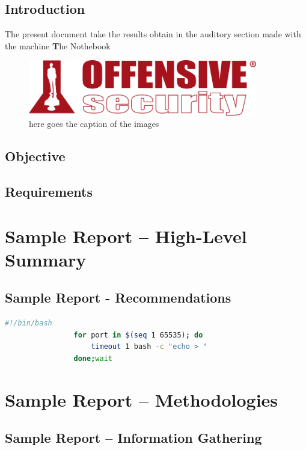 \documentclass[a4paper]{article}
\newcommand{\machinename}{The Nothebook} %
\begin{document}
        \subsection{Introduction}
            The present document take the results obtain in the auditory section made with the 
            machine {\textbf\machinename}
            \vspace{0.2cm}
            \begin{figure}[h]
                \centering
                \includegraphics[width=10cm]{imagenes/offensive-security-logo.png}
                \caption{here goes the caption of the images}
            \end{figure}
        \subsection{Objective}
        \subsection{Requirements}
        

        
    
    \section{Sample Report – High-Level Summary}
        \subsection{Sample Report - Recommendations}        

            \begin{lstlisting}[language=Bash, caption=Script de algo]
                #!/bin/bash
                for port in $(seq 1 65535); do 
                    timeout 1 bash -c "echo > "
                done;wait
            \end{lstlisting}
    \section{Sample Report – Methodologies}
            \subsection{Sample Report – Information Gathering}
\end{document}

